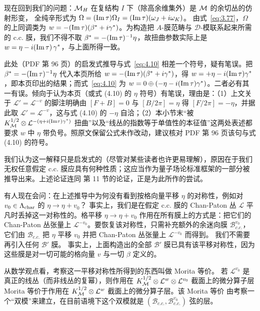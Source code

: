 现在回到我们的问题：${{\mathcal{M}}_H}$ 在复结构 $I$ 下（除高余维集外）是 ${\mathcal{M}}$ 的余切丛的仿射形变，
全纯辛形式为
$\Omega=({\rm Im}\,\tau)\Omega_I=({\rm Im}\,\tau)(\omega_J+i\omega_K)$。
由式~\eqref{eq:3.77}，$\Omega$ 的上同调类为
$w=-({\rm Im}\,\tau)(\beta^*+i\gamma^*)$。为构造把 $A$-膜范畴与 ${\mathcal D}$-模联系起来所需的 c.c. 膜，我们不得不取 $\beta^*=-({\rm Im}\,\tau)^{-1}\eta$，故扭曲参数实际上是 $w=\eta-i({\rm Im}\,\tau)\,\gamma^*$，与上面所得一致。

\begin{yizhu}[原文疑误]
此处（PDF 第 96 页）的启发式推导与式~\eqref{eq:4.10} 相差一个符号，疑有笔误。把 $\beta^*=-({\rm Im}\,\tau)^{-1}\eta$ 代入本页所给 $w=-({\rm Im}\,\tau)(\beta^*+i\gamma^*)$，得 $w=+\eta-i({\rm Im}\,\tau)\gamma^*$，即本页印出的结果；而式~\eqref{eq:4.10} 为 $w=0\oplus(-\eta-i({\rm Im}\,\tau)\gamma^*)$。二者必有其一有误。倾向于认为本页（或式 (4.10) 的 $\eta$ 符号）有笔误，理由是：（1）上文关于 ${\mathcal L}'={\mathcal L}^{-v}$ 的脚注明确由 $[F+B]=0$ 与 $[B/2\pi]=\eta$ 得 $[F/2\pi]=-\eta$，并据此取 ${\mathcal L}'={\mathcal L}^{-v}$，这与式 (4.10) 的 $-\eta$ 自洽；（2）本小节末“被 $K_{\mathcal{M}}^{1/2}\otimes{\mathcal L}^{-(\eta+i({\rm Im}\tau)\gamma^*)}$ 扭曲”以及“线丛的指数等于单值性的本征值”这两处表述都要求 $w$ 中 $\eta$ 带负号。照原文保留公式未作改动，建议核对 PDF 第 96 页该句与式 (4.10) 的符号。
\end{yizhu}

我们认为这一解释只是启发式的（尽管对某些读者也许更易理解），原因在于我们无权任意假定 c.c. 膜应具有何种性质；这应当作为量子场论标准框架的一部分被推导出来。上述论证连同 \cite{ref8} 第 11 节的论证，正是为此所作的尝试。

\bigskip{}


有人现在会问：在上述推导中为何没有看到按格向量平移 $\eta$ 的对称性，例如对 $v_0\in\Lambda_{\rm char}$ 的 $\eta\to\eta+v_0$？
事实上，我们是在假定 c.c. 膜的 Chan-Paton 丛 ${\mathcal L}$ 平凡时丢掉这一对称性的。格平移 $\eta\to\eta+v_0$ 作用在所有膜上的方式是：把它们的 Chan-Paton 丛张量上 ${\mathcal L}^{-v_0}$。要恢复该对称性，只需补充额外的余迷向膜 ${\mathcal B}_{c.c.}^{v_0}$，它们由
${\mathcal B}_{c.c.}$ 把 $\eta$ 平移 $v_0$ 并把 Chan-Paton 丛张量上 ${\mathcal L}^{-v_0}$ 而得到。
我们不需要再引入任何 ${\mathcal B}'$ 膜。
事实上，上面构造出的全部 ${\mathcal B}'$ 膜已具有该平移对称性，因为这些膜是对一切可能的格向量 $v$ 与一切 $\beta$ 定义的。

从数学观点看，考察这一平移对称性所得到的东西叫做 Morita 等价。
若 ${\mathcal L}^{v_0}$ 是真正的线丛（而非线丛的复幂），则作用在
$K_{\mathcal{M}}^{1/2}\otimes {\mathcal L}^w\otimes {\mathcal L}^{v_0}$ 截面上的微分算子层 Morita 等价于作用在
$K_{\mathcal{M}}^{1/2}\otimes {\mathcal L}^w$ 截面上的微分算子层。该 Morita 等价
由考察一个“双模”来建立，在目前语境下这个双模就是
$({\mathcal B}_{c.c.},{\mathcal B}_{c.c.}^{v_0})$ 弦的层。

